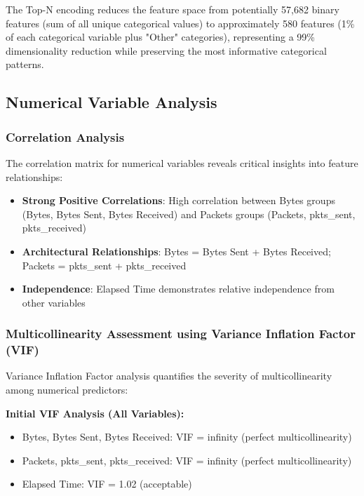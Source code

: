 \documentclass[12pt,a4paper]{article}
\begin{document}
The Top-N encoding reduces the feature space from potentially 57,682 binary features (sum of all unique categorical values) to approximately 580 features (1\% of each categorical variable plus "Other" categories), representing a 99\% dimensionality reduction while preserving the most informative categorical patterns.

\subsection{Numerical Variable Analysis}

\subsubsection{Correlation Analysis}

The correlation matrix for numerical variables reveals critical insights into feature relationships:

\begin{itemize}
    \item \textbf{Strong Positive Correlations}: High correlation between Bytes groups (Bytes, Bytes Sent, Bytes Received) and Packets groups (Packets, pkts\_sent, pkts\_received)
    \item \textbf{Architectural Relationships}: Bytes = Bytes Sent + Bytes Received; Packets = pkts\_sent + pkts\_received
    \item \textbf{Independence}: Elapsed Time demonstrates relative independence from other variables
\end{itemize}

\subsubsection{Multicollinearity Assessment using Variance Inflation Factor (VIF)}

Variance Inflation Factor analysis quantifies the severity of multicollinearity among numerical predictors:

\textbf{Initial VIF Analysis (All Variables):}
\begin{itemize}
    \item Bytes, Bytes Sent, Bytes Received: VIF = infinity (perfect multicollinearity)
    \item Packets, pkts\_sent, pkts\_received: VIF = infinity (perfect multicollinearity)
    \item Elapsed Time: VIF = 1.02 (acceptable)
\end{itemize}
\end{document}
